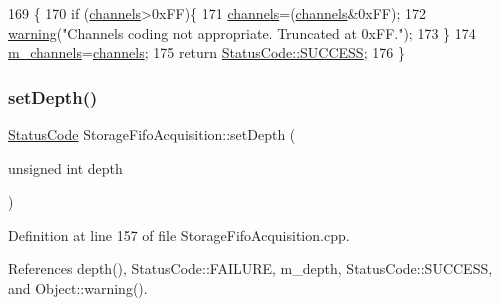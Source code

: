 \begin{DoxyCode}
169                                                                     \{
170   \textcolor{keywordflow}{if} (\hyperlink{classStorageFifoAcquisition_ab8ff708c3269e56312115df8351bbe24}{channels}>0xFF)\{
171     \hyperlink{classStorageFifoAcquisition_ab8ff708c3269e56312115df8351bbe24}{channels}=(\hyperlink{classStorageFifoAcquisition_ab8ff708c3269e56312115df8351bbe24}{channels}&0xFF);
172     \hyperlink{classObject_a65cd4fda577711660821fd2cd5a3b4c9}{warning}(\textcolor{stringliteral}{"Channels coding not appropriate. Truncated at 0xFF."});
173   \}
174   \hyperlink{classStorageFifoAcquisition_ae3563f586533ac15f48c7f9c8fea3e7f}{m\_channels}=\hyperlink{classStorageFifoAcquisition_ab8ff708c3269e56312115df8351bbe24}{channels};
175   \textcolor{keywordflow}{return} \hyperlink{classStatusCode_a6f565cbeadc76d14c72f047e5e85eb4badd0da38d3ba0d922efd1f4619bc37ad8}{StatusCode::SUCCESS};
176 \}
\end{DoxyCode}
\mbox{\label{classStorageFifoAcquisition_a34f9ade5de4933552aa7bcfdf6a9c264}} 
\subsubsection{\texorpdfstring{set\+Depth()}{setDepth()}}
{\footnotesize\ttfamily \hyperlink{classStatusCode}{Status\+Code} Storage\+Fifo\+Acquisition\+::set\+Depth (\begin{DoxyParamCaption}\item[{unsigned int}]{depth }\end{DoxyParamCaption})}



Definition at line 157 of file Storage\+Fifo\+Acquisition.\+cpp.



References depth(), Status\+Code\+::\+F\+A\+I\+L\+U\+RE, m\+\_\+depth, Status\+Code\+::\+S\+U\+C\+C\+E\+SS, and Object\+::warning().


